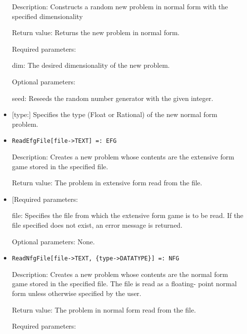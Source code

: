 \begin{itemize}
\bd
\item
[Description:] Constructs a random new problem in normal form with the
specified dimensionality
\item
[Return value:] Returns the new problem in normal form.
\item
[Required parameters:]\hfil\null
	
\bd
\item
[dim:] The desired dimensionality of the new problem.
\ed

\item
[Optional parameters:]\hfil\null
	
\bd
\item
[seed:] Reseeds the random number generator with the given integer.
\item

[type:] Specifies the type (Float or Rational) of the new normal form
problem.
\ed
\ed

\item
\protect \large \begin{verbatim}
ReadEfgFile[file->TEXT] =: EFG
\end{verbatim}\normalsize

\bd
\item
[Description:] Creates a new problem whose contents are the extensive
form game stored in the specified file.
\item
[Return value:] The problem in extensive form read from the file.
\item

[Required parameters:

\bd
\item
[file:] Specifies the file from which the extensive form game is to be
read.  If the file specified does not exist, an error message is
returned.
\ed

\item
[Optional parameters:] None.
\ed

\item
\protect \large \begin{verbatim}
ReadNfgFile[file->TEXT, {type->DATATYPE}] =: NFG
\end{verbatim}\normalsize

\bd
\item
[Description:] Creates a new problem whose contents are the normal
form game stored in the specified file.  The file is read as a
floating- point normal form unless otherwise specified by the user.
\item
[Return value:] The problem in normal form read from the file.
\item
[Required parameters:]\hfil\null


\end{itemize}
